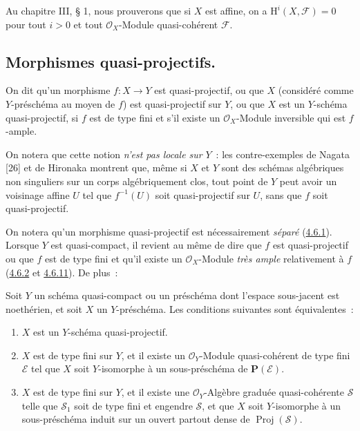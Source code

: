 \begin{remark}[5.2.4]
\label{II.5.2.4-fr}
Au chapitre III, § 1, nous prouverons que si $X$ est affine, on a
$\mathrm{H}^i(X,\mathcal{F})=0$ pour tout $i>0$ et tout
$\mathcal{O}_X$-Module quasi-cohérent $\mathcal{F}$.
\end{remark}

\subsection{Morphismes quasi-projectifs.}
\label{subsection:II.5.3-fr}

\begin{definition}[5.3.1]
\label{II.5.3.1-fr}
On dit qu'un morphisme $f:X\to Y$ est quasi-projectif, ou que $X$
(considéré comme $Y$-préschéma au moyen de $f$) est quasi-projectif
sur $Y$, ou que $X$ est un $Y$-schéma quasi-projectif, si $f$ est de
type fini et s'il existe un $\mathcal{O}_X$-Module inversible qui est
$f$-ample.
\end{definition}

On notera que cette notion \emph{n'est pas locale sur} $Y$~: les contre-exemples de
Nagata [26] et de Hironaka montrent que, même si $X$ et $Y$ sont des schémas
algébriques non singuliers sur un corps algébriquement clos, tout point de
$Y$ peut avoir un voisinage affine $U$ tel que $f^{-1}(U)$ soit
quasi-projectif sur $U$, sans que $f$ soit quasi-projectif.

On notera qu'un morphisme quasi-projectif est nécessairement \emph{séparé}
(\hyperref[II.4.6.1-fr]{4.6.1}). Lorsque $Y$ est quasi-compact, il revient au
même de dire que $f$ est quasi-projectif ou que $f$ est de type fini et qu'il
existe un $\mathcal{O}_X$-Module \emph{très ample} relativement à $f$
(\hyperref[II.4.6.2-fr]{4.6.2} et \hyperref[II.4.6.11-fr]{4.6.11}). De plus~:

\begin{proposition}[5.3.2]
\label{II.5.3.2-fr}
Soit $Y$ un schéma quasi-compact ou un préschéma dont l'espace sous-jacent
est noethérien, et soit $X$ un $Y$-préschéma. Les conditions suivantes sont
équivalentes~:
\begin{enumerate}
  \item[\rm{a)}] $X$ est un $Y$-schéma quasi-projectif.
  \item[\rm{b)}] $X$ est de type fini sur $Y$, et il existe un
  $\mathcal{O}_Y$-Module quasi-cohérent de type fini $\mathcal{E}$ tel que
  $X$ soit $Y$-isomorphe à un sous-préschéma de $\mathbf{P}(\mathcal{E})$.
  \item[\rm{c)}] $X$ est de type fini sur $Y$, et il existe une
  $\mathcal{O}_Y$-Algèbre graduée quasi-cohérente $\mathcal{S}$ telle que
  $\mathcal{S}_1$ soit de type fini et engendre $\mathcal{S}$, et que $X$
  soit $Y$-isomorphe à un sous-préschéma induit sur un ouvert partout dense
  de $\operatorname{Proj}(\mathcal{S})$.
\end{enumerate}
\end{proposition}

